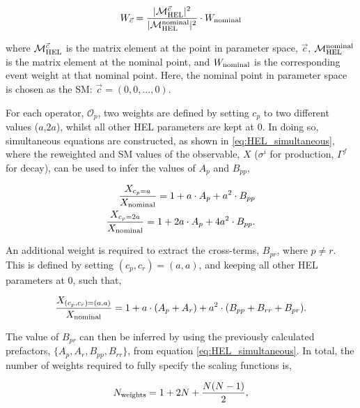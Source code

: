 \begin{equation}
    W_{\vec{c}} = \frac{|\mathcal{M}^{\vec{c}}_{\rm{HEL}}|^2}{|\mathcal{M}^{\rm{nominal}}_{\rm{HEL}}|^2} \cdot W_{\rm{nominal}}
\end{equation}

\noindent
where $\mathcal{M}^{\vec{c}}_{\rm{HEL}}$ is the matrix element at the point in parameter space, $\vec{c}$, $\mathcal{M}^{\rm{nominal}}_{\rm{HEL}}$ is the matrix element at the nominal point, and $W_{\rm{nominal}}$ is the corresponding event weight at that nominal point. Here, the nominal point in parameter space is chosen as the SM: $\vec{c} = (0,0,...,0)$.

For each operator, $\mathcal{O}_p$, two weights are defined by setting $c_p$ to two different values ($a$,$2a$), whilst all other HEL parameters are kept at 0. In doing so, simultaneous equations are constructed, as shown in \ref{eq:HEL_simultaneous}, where the reweighted and SM values of the observable, $X$ ($\sigma^i$ for production, $\Gamma^f$ for decay), can be used to infer the values of $A_p$ and $B_{pp}$,

\begin{equation}\label{eq:HEL_simultaneous}
    \begin{split}
        \frac{X_{c_p=a}}{X_{\rm{nominal}}} = 1 + a \cdot A_p + a^2 \cdot B_{pp} \\
        \frac{X_{c_p=2a}}{X_{\rm{nominal}}} = 1 + 2a \cdot A_p + 4a^2 \cdot B_{pp}.
    \end{split}
\end{equation}

\noindent
An additional weight is required to extract the cross-terms, $B_{pr}$, where $p \neq r$. This is defined by setting $(c_p,c_r)=(a,a)$, and keeping all other HEL parameters at 0, such that,

\begin{equation}
    \frac{X_{(c_p,c_r)=(a,a)}}{X_{\rm{nominal}}} = 1 + a \cdot (A_p+A_r) + a^2 \cdot (B_{pp}+B_{rr}+B_{pr}).
\end{equation}

\noindent
The value of $B_{pr}$ can then be inferred by using the previously calculated prefactors, $\{A_p,A_r,B_{pp},B_{rr}\}$, from equation \ref{eq:HEL_simultaneous}. In total, the number of weights required to fully specify the scaling functions is,

\begin{equation}
    N_{\rm{weights}} = 1 + 2N + \frac{N(N-1)}{2},
\end{equation}

